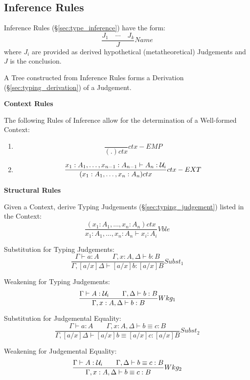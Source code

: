 \subsection{Inference Rules}\label{sec:homotopy_rules}

Inference Rules (\S\ref{sec:type_inference}) have the form:
\[
  \frac{J_1 \quad \cdots \quad J_k} {J} Name
\]
where $J_i$ are provided as derived hypothetical (metatheoretical)
Judgements and $J$ is the conclusion.

A Tree constructed from Inference Rules forms a Derivation
(\S\ref{sec:typing_derivation}) of a Judgement.



\textbf{Context Rules}

The following Rules of Inference allow for the determination of a
Well-formed Context:
\begin{enumerate}
\item
\[
  {
    \frac{}{(.)ctx}
  } ctx-EMP
\]
\item
\[
  {
    \frac
    {x_1:A_1, \ldots, x_{n-1}:A_{n-1} \vdash A_n : \mathcal{U}_i}
    {(x_1:A_1,\ldots,x_n:A_n) ctx}
  } ctx-EXT
\]
\end{enumerate}



\textbf{Structural Rules}

Given a Context, derive Typing Judgements
(\S\ref{sec:typing_judgement}) listed in the Context:
\[
  {
    \frac
    {(x_1:A_1, \ldots, x_n:A_n)ctx}
    {x_1:A_1, \ldots, x_n:A_n \vdash x_i:A_i}
  } Vble
\]

Substitution for Typing Judgements:
\[
  {
    \frac
    {\Gamma \vdash a : A \;\;\;\;\;\;\;
    \Gamma,x:A,\Delta \vdash b : B}
    {\Gamma,[a/x]\Delta \vdash [a/x]b : [a/x]B}
  } Subst_1
\]

Weakening for Typing Judgements:
\[
  {
    \frac
    {\Gamma \vdash A : \mathcal{U}_i \;\;\;\;\;\;\;
    \Gamma,\Delta \vdash b : B}
    {\Gamma,x:A,\Delta \vdash b:B}
  } Wkg_1
\]

Substitution for Judgemental Equality:
\[
  {
    \frac
    {\Gamma \vdash a : A \;\;\;\;\;\;\;
    \Gamma,x:A,\Delta \vdash b \equiv c : B}
    {\Gamma,[a/x]\Delta \vdash [a/x]b \equiv [a/x]c : [a/x]B}
  } Subst_2
\]

Weakening for Judgemental Equality:
\[
  {
    \frac
    {\Gamma \vdash A : \mathcal{U}_i \;\;\;\;\;\;\;
    \Gamma,\Delta \vdash b \equiv c : B}
    {\Gamma, x:A, \Delta \vdash b \equiv c : B}
  } Wkg_2
\]



